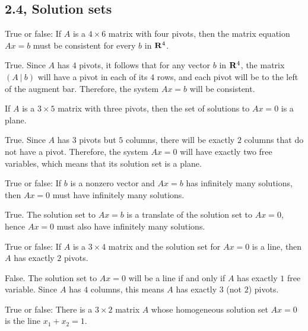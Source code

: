 \subsection{2.4, Solution sets}
\begin{problems}
\problem %
True or false: If $A$ is a $4 \times 6$ matrix with four pivots, then
  the matrix equation $Ax = b$ must be consistent for every $b$ in
  ${\bf R}^4$.  %
  
\begin{solution}
True.  Since $A$ has $4$ pivots, it follows that for
    any vector $b$ in ${\bf R}^4$, the matrix $(A \ | \ b)$ will have
    a pivot in each of its $4$ rows, and each pivot will be to the
    left of the augment bar.  Therefore, the system $Ax = b$ will be
    consistent.  %
\end{solution}

\problem %
If $A$ is a $3 \times 5$ matrix with three pivots, then
  the set of solutions to $Ax = 0$ is a plane. %
  
\begin{solution}
True.  Since $A$ has $3$ pivots but $5$ columns, there
    will be exactly $2$ columns that do not have a pivot.  Therefore,
    the system $Ax = 0$ will have exactly two free variables, which
    means that its solution set is a plane.
\end{solution}

\problem %
True or false: If $b$ is a nonzero vector and $Ax=b$ has infinitely many 
solutions, then $Ax=0$ must have infinitely many solutions.

\begin{solution}
True.  The solution set to $Ax=b$ is a translate of the solution set to 
$Ax=0$, hence $Ax=0$ must also have infinitely many solutions. 
\end{solution}

\problem  %
True or false: If $A$ is a $3 \times 4$ matrix and the solution set for 
$Ax=0$ is a line, then $A$ has exactly $2$ pivots.  \newline %
\begin{solution}
False.  The solution set to $Ax=0$ will be a line if and only if $A$ has 
exactly $1$ free variable.  Since $A$ has $4$ columns, this means $A$ has 
exactly $3$ (not $2$) pivots. %
\end{solution}

\problem %
True or false: There is a $3 \times 2$ matrix $A$ whose homogeneous solution set
$Ax=0$ is the line $x_1 + x_2 = 1$. %


\end{problems}
